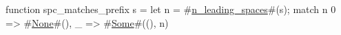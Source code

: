 function spc_matches_prefix s = {
  let n = #\hyperref[sailRISCVznzyleadingzyspaces]{n\_leading\_spaces}#(s);
  match n {
    0 => #\hyperref[sailRISCVzNone]{None}#(),
    _ => #\hyperref[sailRISCVzSome]{Some}#((), n)
  }
}

